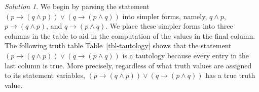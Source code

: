 \documentclass[
  letterpaper,
  10pt,
  reqno,
  twopage,
  openany]{book}
\theoremstyle{plain}
\theoremstyle{definition}
\theoremstyle{definition}
\theoremstyle{definition}
\theoremstyle{plain}
\theoremstyle{plain}
\theoremstyle{remark}
\newtheorem*{solution}{Solution}
\begin{document}
\begin{solution}

We begin by parsing the statement
\((p\rightarrow (q\land p))\lor (q\rightarrow (p\land q))\) into simpler
forms, namely, \(q\land p\), \(p\rightarrow (q\land p)\), and
\(q\rightarrow (p\land q)\). We place these simpler forms into three
columns in the table to aid in the computation of the values in the
final column. The following truth table Table~\ref{tbl-tautology} shows
that the statement
\((p\rightarrow (q\land p))\lor (q\rightarrow (p\land q))\) is a
tautology because every entry in the last column is true. More
precisely, regardless of what truth values are assigned to its statement
variables, \((p\rightarrow (q\land p))\lor (q\rightarrow (p\land q))\)
has a true truth value.

\end{solution}
\end{document}
